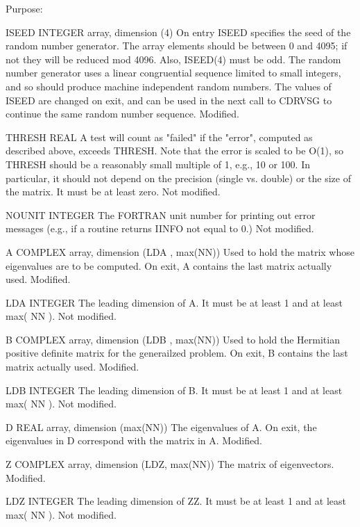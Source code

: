 \begin{DoxyParagraph}{Purpose\+: }
\begin{DoxyVerb}
  ISEED   INTEGER array, dimension (4)
          On entry ISEED specifies the seed of the random number
          generator. The array elements should be between 0 and 4095;
          if not they will be reduced mod 4096.  Also, ISEED(4) must
          be odd.  The random number generator uses a linear
          congruential sequence limited to small integers, and so
          should produce machine independent random numbers. The
          values of ISEED are changed on exit, and can be used in the
          next call to CDRVSG to continue the same random number
          sequence.
          Modified.

  THRESH  REAL
          A test will count as "failed" if the "error", computed as
          described above, exceeds THRESH.  Note that the error
          is scaled to be O(1), so THRESH should be a reasonably
          small multiple of 1, e.g., 10 or 100.  In particular,
          it should not depend on the precision (single vs. double)
          or the size of the matrix.  It must be at least zero.
          Not modified.

  NOUNIT  INTEGER
          The FORTRAN unit number for printing out error messages
          (e.g., if a routine returns IINFO not equal to 0.)
          Not modified.

  A       COMPLEX array, dimension (LDA , max(NN))
          Used to hold the matrix whose eigenvalues are to be
          computed.  On exit, A contains the last matrix actually
          used.
          Modified.

  LDA     INTEGER
          The leading dimension of A.  It must be at
          least 1 and at least max( NN ).
          Not modified.

  B       COMPLEX array, dimension (LDB , max(NN))
          Used to hold the Hermitian positive definite matrix for
          the generailzed problem.
          On exit, B contains the last matrix actually
          used.
          Modified.

  LDB     INTEGER
          The leading dimension of B.  It must be at
          least 1 and at least max( NN ).
          Not modified.

  D       REAL array, dimension (max(NN))
          The eigenvalues of A. On exit, the eigenvalues in D
          correspond with the matrix in A.
          Modified.

  Z       COMPLEX array, dimension (LDZ, max(NN))
          The matrix of eigenvectors.
          Modified.

  LDZ     INTEGER
          The leading dimension of ZZ.  It must be at least 1 and
          at least max( NN ).
          Not modified.


\end{DoxyVerb}
\end{DoxyParagraph}
